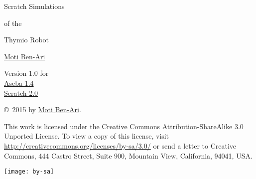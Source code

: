 
\thispagestyle{empty}

\begin{center}
\begin{Huge}
\begin{bfseries}
Scratch Simulations

of the

Thymio Robot

\end{bfseries}
\end{Huge}

\vskip 2cm

\begin{LARGE}
\href{http://www.weizmann.ac.il/sci-tea/benari/}{Moti Ben-Ari}\\%
\end{LARGE}

\vskip 1cm

\begin{Large}
Version 1.0 for\\
\bigskip
\href{https://aseba.wikidot.com/en:downloadinstall}{Aseba 1.4}\\
\bigskip
\href{https://scratch.mit.edu/}{Scratch 2.0}
\end{Large}

\end{center}

\vfill

\begin{center}
\copyright{}\  2015 by \href{http://www.weizmann.ac.il/sci-tea/benari/}{Moti Ben-Ari}.%
\end{center}

This work is licensed under the Creative Commons
Attribution-ShareAlike 3.0 Unported License. To view a copy
of this license, visit
\url{http://creativecommons.org/licenses/by-sa/3.0/}
or send a letter to Creative Commons, 444 Castro Street, Suite 900,
Mountain View, California, 94041, USA.

\begin{center}
\texttt{[image: by-sa]}
\end{center}

\newpage
\begin{spacing}{0.7}
\tableofcontents
\end{spacing}
\thispagestyle{empty}
\newpage
\setcounter{page}{1}

